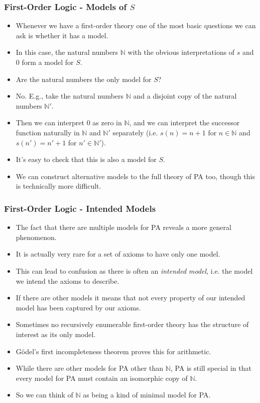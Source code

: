 \documentclass[handout]{beamer}
\begin{document}
\begin{frame}
\frametitle{First-Order Logic - Models of $S$} 
\begin{itemize}
\item Whenever we have a first-order theory one of the most basic questions we can ask is whether it has a model. 
\vspace{0.1cm}
\item In this case, the natural numbers $\mathbb{N}$ with the obvious interpretations of $s$ and $0$ form a model for $S$.
\vspace{0.1cm}
\item Are the natural numbers the only model for $S$? 
\vspace{0.1cm}
\item No. E.g., take the natural numbers $\mathbb{N}$ and a disjoint copy of the natural numbers $\mathbb{N}'$. 
\vspace{0.1cm}
\item Then we can interpret $0$ as zero in $\mathbb{N}$, and we can interpret the successor function naturally in $\mathbb{N}$ and $\mathbb{N}'$ separately (i.e. $s(n)=n+1$ for $n\in \mathbb{N}$ and $s(n')=n'+1$ for $n'\in\mathbb{N}'$). 
\vspace{0.1cm}
\item It's easy to check that this is also a model for $S$. 
\vspace{0.1cm}
\item We can construct alternative models to the full theory of PA too, though this is technically more difficult.
\end{itemize}
\end{frame}

\begin{frame}
\frametitle{First-Order Logic - Intended Models} 
\begin{itemize}
\item The fact that there are multiple models for PA reveals a more general phenomenon. 
\item It is actually very rare for a set of axioms to have only one model. 
\item This can lead to confusion as there is often an \emph{intended model}, i.e. the model we intend the axioms to describe. 
\item If there are other models it means that not every property of our intended model has been captured by our axioms. 
\item Sometimes no recursively enumerable first-order theory has the structure of interest as its only model. 
\item G\"odel's first incompleteness theorem proves this for arithmetic.
\item While there are other models for PA other than $\mathbb{N}$, PA is still special in that every model for PA must contain an isomorphic copy of $\mathbb{N}$. 
\item So we can think of $\mathbb{N}$ as being a kind of minimal model for PA. 
\end{itemize}
\end{frame}
\end{document}
